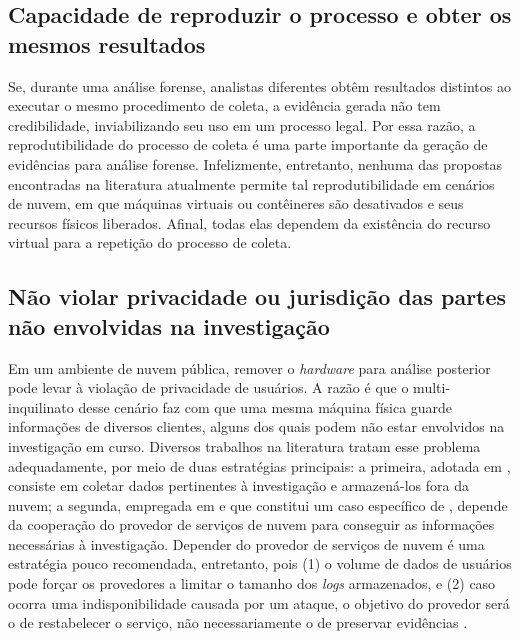 \subsection{Capacidade de reproduzir o processo e obter os mesmos resultados}
\label{sec:reprodutibilidade}

Se, durante uma análise forense, analistas diferentes obtêm resultados distintos ao executar o mesmo procedimento de coleta, a evidência gerada não tem credibilidade, inviabilizando seu uso em um processo legal. 
%
Por essa razão, a reprodutibilidade do processo de coleta é uma parte importante da geração de evidências para análise forense.
%
Infelizmente, entretanto, nenhuma das propostas encontradas na literatura atualmente permite tal reprodutibilidade em cenários de nuvem, em que máquinas virtuais ou contêineres são desativados e seus recursos físicos liberados.
%
Afinal, todas elas dependem da existência do recurso virtual para a repetição do processo de coleta.

\subsection{Não violar privacidade ou jurisdição das partes não envolvidas na investigação}
\label{sec:legais}

Em um ambiente de nuvem pública, remover o \textit{hardware} para análise posterior pode levar à violação de privacidade de usuários.
%
A razão é que o multi-inquilinato desse cenário faz com que uma mesma máquina física guarde informações de diversos clientes, alguns dos quais podem não estar envolvidos na investigação em curso.
%
Diversos trabalhos na literatura tratam esse problema adequadamente, por meio de duas estratégias principais: a primeira, adotada em \cite{ReichertAutoAcquisition:2015,GeorgeDF2CE:2012,PoiselVMI:2013,DykstraFROST:2013,FaaSIndexedSearch:2012}, consiste em coletar dados pertinentes à investigação e armazená-los fora da nuvem; a segunda, empregada em \cite{SangLogApproach:2013} e que constitui um caso específico de \cite{GeorgeDF2CE:2012}, depende da cooperação do provedor de serviços de nuvem para conseguir as informações necessárias à investigação. 
%
Depender do provedor de serviços de nuvem é uma estratégia pouco recomendada, entretanto, pois (1) o volume de dados de usuários pode forçar os provedores a limitar o tamanho dos \textit{logs} armazenados, e (2) caso ocorra uma indisponibilidade causada por um ataque, o objetivo do provedor será o de restabelecer o serviço, não necessariamente o de preservar evidências \cite{ClarkeReviewOfChallenges2015}. 



